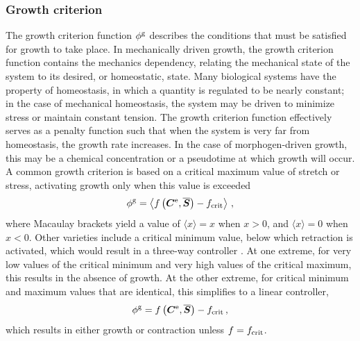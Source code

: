 \documentclass[10pt,letterpaper,oneside]{report}
\newcommand{\ten}[1]{\mbox{\boldmath $#1$}{}}
\newcommand{\scas}[1]{\mbox{{\scriptsize{${\rm{#1}}$}}}{}}
\begin{document}
\subsubsection{Growth criterion}
\label{subsec:crit}
The growth criterion function $\phi^{\scas{g}}$ describes the conditions that must be satisfied for growth to take place.  
In mechanically driven growth, the growth criterion function contains the mechanics dependency, relating the mechanical state of the system to its desired, or homeostatic, state.  Many biological systems have the property of homeostasis, in which a quantity is regulated to be nearly constant; in the case of mechanical homeostasis, the system may be driven to minimize stress or maintain constant tension.  The growth criterion function effectively serves as a penalty function such that when the system is very far from homeostasis, the growth rate increases.  
In the case of morphogen-driven growth, this may be a chemical concentration or a pseudotime at which growth will occur.  
A common growth criterion is based on a critical maximum value of stretch or stress, activating growth only when this value is exceeded
\begin{equation}
\phi^{\scas{g}} = \left\langle f \left( \ten{C}^{\scas{e}}, \overline{\ten{S}} \right) - f_{\scas{crit}} \right\rangle \, ,
\end{equation}
where Macaulay brackets yield a value of $ \langle x \rangle = x $ when $ x > 0$, and $ \langle x \rangle = 0 $ when $ x < 0$.  
Other varieties include a critical minimum value, below which retraction is activated, which would result in a three-way controller \autocite{Dennerll1989}.  At one extreme, for very low values of the critical minimum and very high values of the critical maximum, this results in the absence of growth.  At the other extreme, for critical minimum and maximum values that are identical, this simplifies to a linear controller, 
\begin{equation}
\phi^{\scas{g}} = f \left( \ten{C}^{\scas{e}}, \overline{\ten{S}} \right) - f_{\scas{crit}} \, ,
\end{equation}
which results in either growth or contraction unless $f = f_{\scas{crit}}$.
\end{document}
